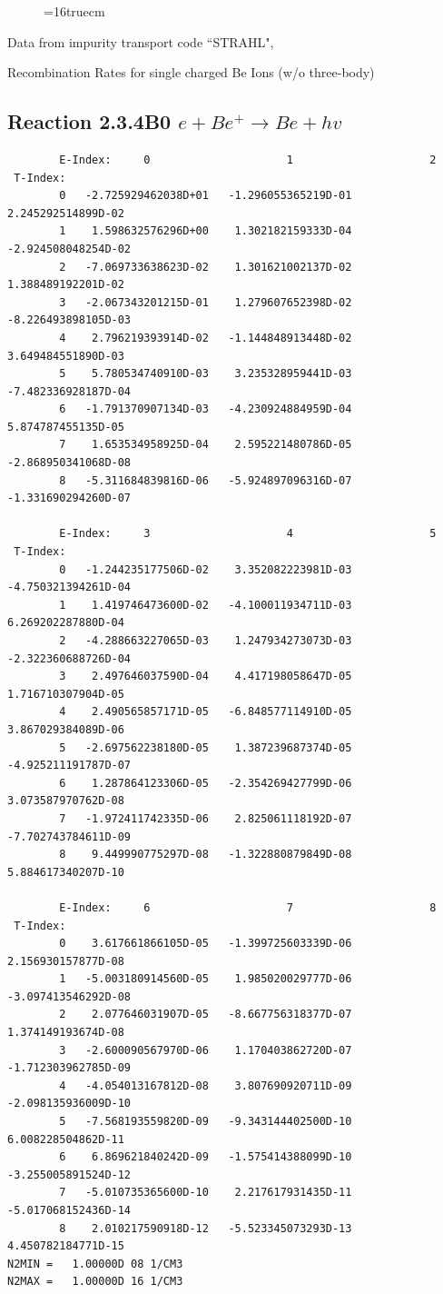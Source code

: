 \documentclass[12pt,dvipdfmx]{article}
\begin{document}
\begin{figure} \label{2.3.2C}
\epsfxsize=16truecm
\end{figure}
\newpage
Data from impurity transport code ``STRAHL", \cite{kn:Behringer}

  Recombination Rates for single charged Be Ions (w/o three-body)

\subsection{
Reaction 2.3.4B0  $e + Be^+ \rightarrow Be + hv$
}


\begin{small}\begin{verbatim}
        E-Index:     0                     1                     2
 T-Index:
        0   -2.725929462038D+01   -1.296055365219D-01    2.245292514899D-02
        1    1.598632576296D+00    1.302182159333D-04   -2.924508048254D-02
        2   -7.069733638623D-02    1.301621002137D-02    1.388489192201D-02
        3   -2.067343201215D-01    1.279607652398D-02   -8.226493898105D-03
        4    2.796219393914D-02   -1.144848913448D-02    3.649484551890D-03
        5    5.780534740910D-03    3.235328959441D-03   -7.482336928187D-04
        6   -1.791370907134D-03   -4.230924884959D-04    5.874787455135D-05
        7    1.653534958925D-04    2.595221480786D-05   -2.868950341068D-08
        8   -5.311684839816D-06   -5.924897096316D-07   -1.331690294260D-07

        E-Index:     3                     4                     5
 T-Index:
        0   -1.244235177506D-02    3.352082223981D-03   -4.750321394261D-04
        1    1.419746473600D-02   -4.100011934711D-03    6.269202287880D-04
        2   -4.288663227065D-03    1.247934273073D-03   -2.322360688726D-04
        3    2.497646037590D-04    4.417198058647D-05    1.716710307904D-05
        4    2.490565857171D-05   -6.848577114910D-05    3.867029384089D-06
        5   -2.697562238180D-05    1.387239687374D-05   -4.925211191787D-07
        6    1.287864123306D-05   -2.354269427799D-06    3.073587970762D-08
        7   -1.972411742335D-06    2.825061118192D-07   -7.702743784611D-09
        8    9.449990775297D-08   -1.322880879849D-08    5.884617340207D-10

        E-Index:     6                     7                     8
 T-Index:
        0    3.617661866105D-05   -1.399725603339D-06    2.156930157877D-08
        1   -5.003180914560D-05    1.985020029777D-06   -3.097413546292D-08
        2    2.077646031907D-05   -8.667756318377D-07    1.374149193674D-08
        3   -2.600090567970D-06    1.170403862720D-07   -1.712303962785D-09
        4   -4.054013167812D-08    3.807690920711D-09   -2.098135936009D-10
        5   -7.568193559820D-09   -9.343144402500D-10    6.008228504862D-11
        6    6.869621840242D-09   -1.575414388099D-10   -3.255005891524D-12
        7   -5.010735365600D-10    2.217617931435D-11   -5.017068152436D-14
        8    2.010217590918D-12   -5.523345073293D-13    4.450782184771D-15
N2MIN =   1.00000D 08 1/CM3
N2MAX =   1.00000D 16 1/CM3


\end{verbatim}
\end{small}
\end{document}
